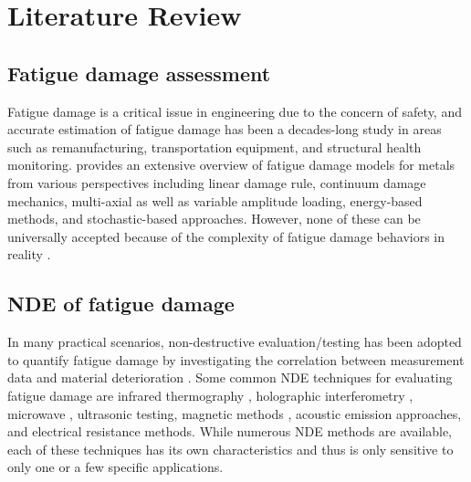 \chapter{Literature Review}
\label{chap: litrev}

\section{Fatigue damage assessment}
Fatigue damage is a critical issue in engineering due to the concern of safety, and accurate estimation of fatigue damage has been a decades-long study in areas such as remanufacturing, transportation equipment, and structural health monitoring.  provides an extensive overview of fatigue damage models for metals from various perspectives including linear damage rule, continuum damage mechanics, multi-axial as well as variable amplitude loading, energy-based methods, and stochastic-based approaches. However, none of these can be universally accepted because of the complexity of fatigue damage behaviors in reality \cite{fatigue-review-Santecchia2016}.

\section{NDE of fatigue damage}
In many practical scenarios, non-destructive evaluation/testing has been adopted to quantify fatigue damage by investigating the correlation between measurement data and material deterioration \cite{nde-review-ACHENBACH200013}. Some common NDE techniques for evaluating fatigue damage are infrared thermography \cite{nde-thermo-FAN20121}, holographic interferometry \cite{nde-dic}, microwave \cite{nde-microwave}, ultrasonic testing, magnetic methods \cite{nde-magnetic}, acoustic emission approaches, and electrical resistance methods. While numerous NDE methods are available, each of these techniques has its own characteristics and thus is only sensitive to only one or a few specific applications.

